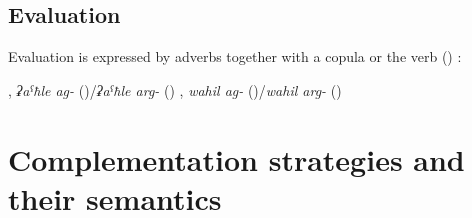 
\subsection{Evaluation}
\label{ssec:Evaluation}

Evaluation is expressed by adverbs together with a copula or the verb  () :
%
\begin{exe}
	\ex	\label{ex:evaluation verbs}
	\begin{xlist}
		\ex	{}, \textit{ʡaˁħle ag-} ()\slash\textit{ʡaˁħle arg-} () 
		\ex	{}, \textit{wahil ag-} ()\slash\textit{wahil arg-} () 
	\end{xlist}
\end{exe}



\section{Complementation strategies and their semantics}
\label{sec:Complementation strategies and their semantics}

